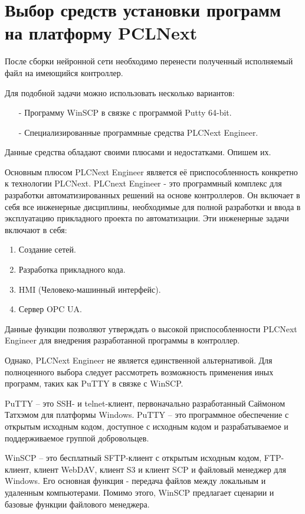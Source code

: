 \section{Выбор средств установки программ на платформу PCLNext}

После сборки нейронной сети необходимо перенести полученный исполняемый файл на имеющийся контроллер.

Для подобной задачи можно использовать несколько вариантов:

\begin{itemize}
    \item[-] Программу WinSCP в связке с программой Putty 64-bit.
    \item[-] Специализированные программные средства PLCNext Engineer.
\end{itemize}

Данные средства обладают своими плюсами и недостатками. Опишем их. 

Основным плюсом PLCNext Engineer является её приспособленность конкретно к технологии PLCNext. PLCnext Engineer - это программный комплекс для разработки автоматизированных решений на основе контроллеров. Он включает в себя все инженерные дисциплины, необходимые для полной разработки и ввода в эксплуатацию прикладного проекта по автоматизации. Эти инженерные задачи включают в себя:

\begin{enumerate}
    \item Создание сетей.
    \item Разработка прикладного кода.
    \item HMI (Человеко-машинный интерфейс).
    \item Сервер OPC UA.
\end{enumerate}

Данные функции позволяют утверждать о высокой приспособленности PLCNext Engineer для внедрения разработанной программы в контроллер.

Однако, PLCNext Engineer не является единственной альтернативой. Для полноценного выбора следует рассмотреть возможность применения иных программ, таких как PuTTY в связке с WinSCP.

PuTTY {--} это SSH- и telnet-клиент, первоначально разработанный Саймоном Татхэмом для платформы Windows. PuTTY {--} это программное обеспечение с открытым исходным кодом, доступное с исходным кодом и разрабатываемое и поддерживаемое группой добровольцев.

WinSCP {--} это бесплатный SFTP-клиент с открытым исходным кодом, FTP-клиент, клиент WebDAV, клиент S3 и клиент SCP и файловый менеджер для Windows. Его основная функция - передача файлов между локальным и удаленным компьютерами. Помимо этого, WinSCP предлагает сценарии и базовые функции файлового менеджера.

